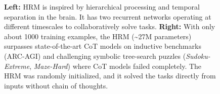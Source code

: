 \begin{figure}[h]
  \centering
  \vspace*{-0.5ex}%
  \caption{\textbf{Left:} HRM is inspired by hierarchical processing and temporal separation in the brain. It has two recurrent networks operating at different timescales to collaboratively solve tasks. \textbf{Right:} With only about 1000 training examples, the HRM (\textasciitilde27M parameters) surpasses state-of-the-art CoT models on inductive benchmarks (ARC-AGI) and challenging symbolic tree-search puzzles (\textit{Sudoku-Extreme}, \textit{Maze-Hard}) where CoT models failed completely. The HRM was randomly initialized, and it solved the tasks directly from inputs without chain of thoughts.}
  \label{fig:benchmark_bars}
  \vspace*{-1ex}%
\end{figure}